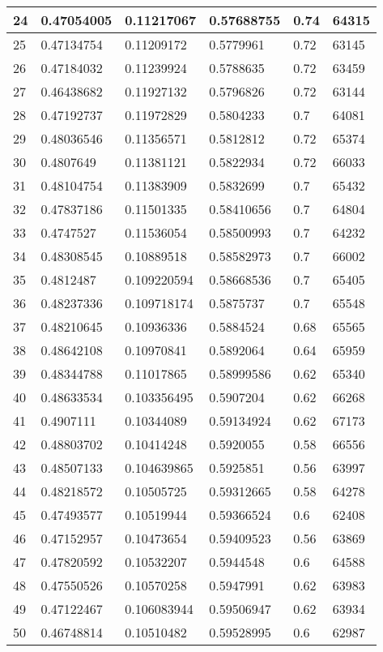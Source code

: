 \begin{longtable}{|l|l|l|l|l|l|}
24 & 0.47054005 & 0.11217067 & 0.57688755 & 0.74 & 64315 \\ \hline 
25 & 0.47134754 & 0.11209172 & 0.5779961 & 0.72 & 63145 \\ \hline 
26 & 0.47184032 & 0.11239924 & 0.5788635 & 0.72 & 63459 \\ \hline 
27 & 0.46438682 & 0.11927132 & 0.5796826 & 0.72 & 63144 \\ \hline 
28 & 0.47192737 & 0.11972829 & 0.5804233 & 0.7 & 64081 \\ \hline 
29 & 0.48036546 & 0.11356571 & 0.5812812 & 0.72 & 65374 \\ \hline 
30 & 0.4807649 & 0.11381121 & 0.5822934 & 0.72 & 66033 \\ \hline 
31 & 0.48104754 & 0.11383909 & 0.5832699 & 0.7 & 65432 \\ \hline 
32 & 0.47837186 & 0.11501335 & 0.58410656 & 0.7 & 64804 \\ \hline 
33 & 0.4747527 & 0.11536054 & 0.58500993 & 0.7 & 64232 \\ \hline 
34 & 0.48308545 & 0.10889518 & 0.58582973 & 0.7 & 66002 \\ \hline 
35 & 0.4812487 & 0.109220594 & 0.58668536 & 0.7 & 65405 \\ \hline 
36 & 0.48237336 & 0.109718174 & 0.5875737 & 0.7 & 65548 \\ \hline 
37 & 0.48210645 & 0.10936336 & 0.5884524 & 0.68 & 65565 \\ \hline 
38 & 0.48642108 & 0.10970841 & 0.5892064 & 0.64 & 65959 \\ \hline 
39 & 0.48344788 & 0.11017865 & 0.58999586 & 0.62 & 65340 \\ \hline 
40 & 0.48633534 & 0.103356495 & 0.5907204 & 0.62 & 66268 \\ \hline 
41 & 0.4907111 & 0.10344089 & 0.59134924 & 0.62 & 67173 \\ \hline 
42 & 0.48803702 & 0.10414248 & 0.5920055 & 0.58 & 66556 \\ \hline 
43 & 0.48507133 & 0.104639865 & 0.5925851 & 0.56 & 63997 \\ \hline 
44 & 0.48218572 & 0.10505725 & 0.59312665 & 0.58 & 64278 \\ \hline 
45 & 0.47493577 & 0.10519944 & 0.59366524 & 0.6 & 62408 \\ \hline 
46 & 0.47152957 & 0.10473654 & 0.59409523 & 0.56 & 63869 \\ \hline 
47 & 0.47820592 & 0.10532207 & 0.5944548 & 0.6 & 64588 \\ \hline 
48 & 0.47550526 & 0.10570258 & 0.5947991 & 0.62 & 63983 \\ \hline 
49 & 0.47122467 & 0.106083944 & 0.59506947 & 0.62 & 63934 \\ \hline 
50 & 0.46748814 & 0.10510482 & 0.59528995 & 0.6 & 62987 \\ \hline 
\end{longtable}